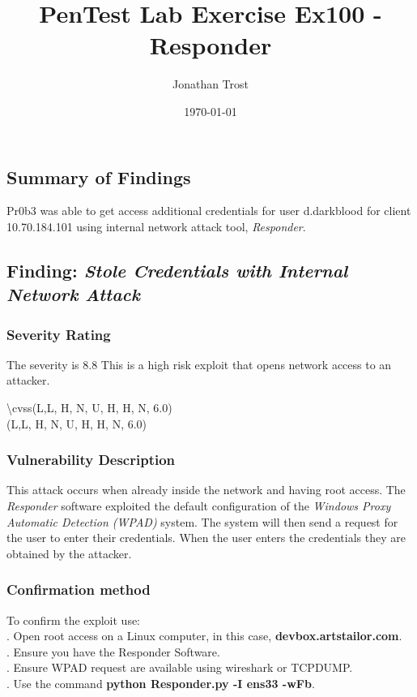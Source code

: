 \documentclass[notitlepage]{article}
\begin{document}
	
	
	\title{PenTest Lab Exercise Ex100 - Responder}
	\author{Jonathan Trost}
	\date{\isodate\today}
	
	\maketitle
	
	\tableofcontents
	
	\newpage 
	
	\subsection{Summary of Findings}
	\indent Pr0b3 was able to get access additional credentials for user d.darkblood for client 10.70.184.101 using internal network attack tool, \textit{Responder}.
	
	\subsection{Finding: \emph{Stole Credentials with Internal Network Attack}}
	
	\subsubsection{Severity Rating}
	\indent The severity is 8.8 This is a high risk exploit that opens network access to an attacker. 
	
	\textbackslash cvss(L,L, H, N, U, H, H, N, 6.0)\\
	\cvss(L,L, H, N, U, H, H, N, 6.0) \\
	
	\subsubsection{Vulnerability Description}
	\indent This attack occurs when already inside the network and having root access. The \textit{Responder} software exploited the default configuration of the \textit{Windows Proxy Automatic Detection (WPAD)} system.  The system will then send a request for the user to enter their credentials.  When the user enters the credentials they are obtained by the attacker.  
	
	\subsubsection{Confirmation method}
	To confirm the exploit use: \\
	. Open root access on a Linux computer, in this case, \textbf{devbox.artstailor.com}. \\
	. Ensure you have the Responder Software. \\
	. Ensure WPAD request are available using wireshark or TCPDUMP. \\
	. Use the command \textbf{python Responder.py -I ens33 -wFb}.\\
	
\end{document}
